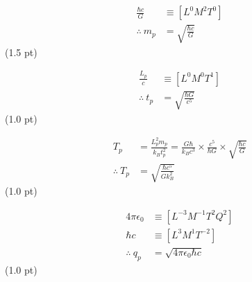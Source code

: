 \begin{align*}
  \frac{\hbar c}{G} &\equiv \left[L^0 M^2 T^0\right]\\
  \therefore\ m_p &= \sqrt{\frac{\hbar c}{G}}
\end{align*}
\hfill(1.5 pt)

\begin{align*}
  \frac{L_p}{c} &\equiv \left[L^0 M^0 T^1\right]\\
  \therefore\ t_p &= \sqrt{\frac{\hbar G}{c^5}}
\end{align*}
\hfill(1.0 pt)

\begin{align*}
  T_p &= \frac{L_p^2 m_p}{k_B t_p^2}
       = \frac{G\hbar}{k_B c^3} \times \frac{c^5}{\hbar G}
         \times \sqrt{\frac{\hbar c}{G}}\\
  \therefore\ T_p &= \sqrt{\frac{\hbar c^5}{G k_B^2}}
\end{align*}
\hfill(1.0 pt)

\begin{align*}
  4\pi\epsilon_0 &\equiv \left[L^{-3} M^{-1} T^2 Q^2\right]\\
  \hbar c &\equiv \left[L^3 M^1 T^{-2}\right]\\
  \therefore\ q_p &= \sqrt{4\pi\epsilon_0 \hbar c}
\end{align*}
\hfill(1.0 pt)

